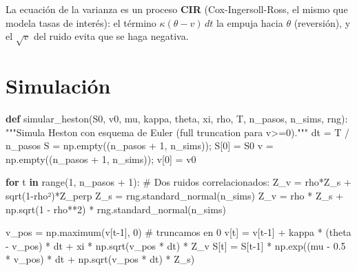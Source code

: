 \documentclass[
  spanish,
  letterpaper,
  DIV=11,
  numbers=noendperiod]{scrreprt}
\newenvironment{Shaded}{\begin{snugshade}}{\end{snugshade}}
\newcommand{\BuiltInTok}[1]{\textcolor[rgb]{0.00,0.23,0.31}{#1}}
\newcommand{\CommentTok}[1]{\textcolor[rgb]{0.37,0.37,0.37}{#1}}
\newcommand{\ControlFlowTok}[1]{\textcolor[rgb]{0.00,0.23,0.31}{\textbf{#1}}}
\newcommand{\DecValTok}[1]{\textcolor[rgb]{0.68,0.00,0.00}{#1}}
\newcommand{\FloatTok}[1]{\textcolor[rgb]{0.68,0.00,0.00}{#1}}
\newcommand{\KeywordTok}[1]{\textcolor[rgb]{0.00,0.23,0.31}{\textbf{#1}}}
\newcommand{\NormalTok}[1]{\textcolor[rgb]{0.00,0.23,0.31}{#1}}
\newcommand{\OperatorTok}[1]{\textcolor[rgb]{0.37,0.37,0.37}{#1}}
\begin{document}
La ecuación de la varianza es un proceso \textbf{CIR}
(Cox-Ingersoll-Ross, el mismo que modela tasas de interés): el término
\(\kappa(\theta - v)\,dt\) la empuja hacia \(\theta\) (reversión), y el
\(\sqrt{v}\) del ruido evita que se haga negativa.

\section{Simulación}\label{simulaciuxf3n-1}

\label{heston-sim}
\begin{Shaded}
\begin{Highlighting}[]
\KeywordTok{def}\NormalTok{ simular\_heston(S0, v0, mu, kappa, theta, xi, rho, T, n\_pasos, n\_sims, rng):}
    \CommentTok{"""Simula Heston con esquema de Euler (full truncation para v\textgreater{}=0)."""}
\NormalTok{    dt }\OperatorTok{=}\NormalTok{ T }\OperatorTok{/}\NormalTok{ n\_pasos}
\NormalTok{    S }\OperatorTok{=}\NormalTok{ np.empty((n\_pasos }\OperatorTok{+} \DecValTok{1}\NormalTok{, n\_sims))}\OperatorTok{;}\NormalTok{ S[}\DecValTok{0}\NormalTok{] }\OperatorTok{=}\NormalTok{ S0}
\NormalTok{    v }\OperatorTok{=}\NormalTok{ np.empty((n\_pasos }\OperatorTok{+} \DecValTok{1}\NormalTok{, n\_sims))}\OperatorTok{;}\NormalTok{ v[}\DecValTok{0}\NormalTok{] }\OperatorTok{=}\NormalTok{ v0}

    \ControlFlowTok{for}\NormalTok{ t }\KeywordTok{in} \BuiltInTok{range}\NormalTok{(}\DecValTok{1}\NormalTok{, n\_pasos }\OperatorTok{+} \DecValTok{1}\NormalTok{):}
        \CommentTok{\# Dos ruidos correlacionados: Z\_v = rho*Z\_s + sqrt(1{-}rho²)*Z\_perp}
\NormalTok{        Z\_s }\OperatorTok{=}\NormalTok{ rng.standard\_normal(n\_sims)}
\NormalTok{        Z\_v }\OperatorTok{=}\NormalTok{ rho }\OperatorTok{*}\NormalTok{ Z\_s }\OperatorTok{+}\NormalTok{ np.sqrt(}\DecValTok{1} \OperatorTok{{-}}\NormalTok{ rho}\OperatorTok{**}\DecValTok{2}\NormalTok{) }\OperatorTok{*}\NormalTok{ rng.standard\_normal(n\_sims)}

\NormalTok{        v\_pos }\OperatorTok{=}\NormalTok{ np.maximum(v[t}\OperatorTok{{-}}\DecValTok{1}\NormalTok{], }\DecValTok{0}\NormalTok{)                      }\CommentTok{\# truncamos en 0}
\NormalTok{        v[t] }\OperatorTok{=}\NormalTok{ v[t}\OperatorTok{{-}}\DecValTok{1}\NormalTok{] }\OperatorTok{+}\NormalTok{ kappa }\OperatorTok{*}\NormalTok{ (theta }\OperatorTok{{-}}\NormalTok{ v\_pos) }\OperatorTok{*}\NormalTok{ dt }\OperatorTok{+}\NormalTok{ xi }\OperatorTok{*}\NormalTok{ np.sqrt(v\_pos }\OperatorTok{*}\NormalTok{ dt) }\OperatorTok{*}\NormalTok{ Z\_v}
\NormalTok{        S[t] }\OperatorTok{=}\NormalTok{ S[t}\OperatorTok{{-}}\DecValTok{1}\NormalTok{] }\OperatorTok{*}\NormalTok{ np.exp((mu }\OperatorTok{{-}} \FloatTok{0.5} \OperatorTok{*}\NormalTok{ v\_pos) }\OperatorTok{*}\NormalTok{ dt }\OperatorTok{+}\NormalTok{ np.sqrt(v\_pos }\OperatorTok{*}\NormalTok{ dt) }\OperatorTok{*}\NormalTok{ Z\_s)}


\end{Highlighting}
\end{Shaded}
\end{document}
